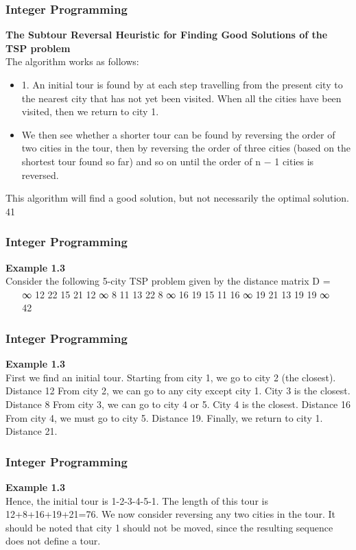 \begin{frame}
 \frametitle{Integer Programming}     

\noindent\textbf{The Subtour Reversal Heuristic for Finding Good
Solutions of the TSP problem}\\ 
The algorithm works as follows:
\begin{itemize}
	\item 1. An initial tour is found by at each step travelling
	from the present city to the nearest city that has not
	yet been visited. When all the cities have been
	visited, then we return to city 1.
	\item We then see whether a shorter tour can be found by
	reversing the order of two cities in the tour, then by
	reversing the order of three cities (based on the
	shortest tour found so far) and so on until the order
	of n − 1 cities is reversed.
\end{itemize}

This algorithm will find a good solution, but not necessarily the
optimal solution.
41 
\end{frame}  
\begin{frame} 
\frametitle{Integer Programming}     
\noindent \textbf{Example 1.3}\\
Consider the following 5-city TSP problem given by the distance
matrix
D =


∞ 12 22 15 21
12 ∞ 8 11 13
22 8 ∞ 16 19
15 11 16 ∞ 19
21 13 19 19 ∞


42 \end{frame}  
\begin{frame} 
\frametitle{Integer Programming}     
\noindent \textbf{Example 1.3}\\
First we find an initial tour. Starting from city 1, we go to city 2
(the closest). Distance 12
From city 2, we can go to any city except city 1. City 3 is the
closest. Distance 8
From city 3, we can go to city 4 or 5. City 4 is the closest.
Distance 16
From city 4, we must go to city 5. Distance 19.
Finally, we return to city 1. Distance 21.
\end{frame}  
\begin{frame} 
\frametitle{Integer Programming}     
\noindent\textbf{Example 1.3}\\
Hence, the initial tour is 1-2-3-4-5-1.
The length of this tour is 12+8+16+19+21=76.
We now consider reversing any two cities in the tour.
It should be noted that city 1 should not be moved, since the
resulting sequence does not define a tour.
\end{frame}  
